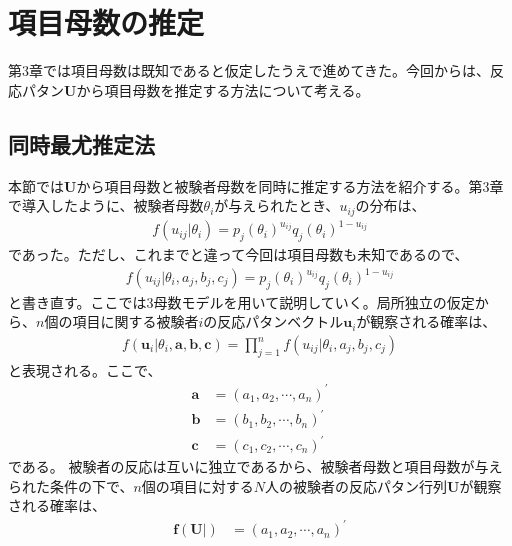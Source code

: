 \documentclass[12pt]{jarticle}
\begin{document}
\section{項目母数の推定}
第$3$章では項目母数は既知であると仮定したうえで進めてきた。今回からは、反応パタン$\boldsymbol U$から項目母数を推定する方法について考える。
\subsection{同時最尤推定法}
本節では$\boldsymbol U$から項目母数と被験者母数を同時に推定する方法を紹介する。第$3$章で導入したように、被験者母数$\theta_i$が与えられたとき、$u_{ij}$の分布は、
\begin{align}
  \label{03}
  \displaystyle f(u_{ij}|\theta_i) = p_j(\theta_i)^{u_{ij}}q_j(\theta_i)^{1-u_{ij}} \tag{4.1}
\end{align}
であった。ただし、これまでと違って今回は項目母数も未知であるので、
\begin{align}
  \label{04}
  \displaystyle f(u_{ij}|\theta_i,a_j,b_j,c_j) = p_j(\theta_i)^{u_{ij}}q_j(\theta_i)^{1-u_{ij}} \tag{4.2}
\end{align}
と書き直す。ここでは$3$母数モデルを用いて説明していく。局所独立の仮定から、$n$個の項目に関する被験者$i$の反応パタンベクトル$\boldsymbol u_i$が観察される確率は、
\begin{align}
  \label{05}
  \displaystyle f(\boldsymbol u_i|\theta_i,\boldsymbol a,\boldsymbol  b,\boldsymbol  c) = \prod_{j = 1}^{n} f(u_{ij}|\theta_i,a_j,b_j,c_j) \tag{4.3}
\end{align}
と表現される。ここで、
\begin{align}
  \label{06}
  \displaystyle \boldsymbol{a}&=(a_1,a_2,\cdots,a_n)^{\prime} \tag{4.4}\\
  \boldsymbol{b}&= (b_1,b_2,\cdots,b_n)^{\prime}\tag{4.5}\\
  \boldsymbol{c}&= (c_1,c_2,\cdots,c_n)^{\prime}\tag{4.6}
\end{align}
である。
被験者の反応は互いに独立であるから、被験者母数と項目母数が与えられた条件の下で、$n$個の項目に対する$N$人の被験者の反応パタン行列$\boldsymbol{U}$が観察される確率は、
\begin{align}
  \label{07}
  \displaystyle \boldsymbol{f}(\boldsymbol{U}|)&=(a_1,a_2,\cdots,a_n)^{\prime} \tag{4.7}
\end{align}
\end{document}
